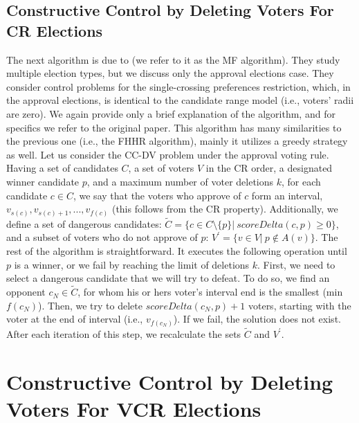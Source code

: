 \subsection{Constructive Control by Deleting Voters For CR Elections}\label{ch5:sec:1:cc-dv-cr}

The next algorithm is due to \cite{control-cr-how-hard-magiera-faliszewski} (we refer to it as the MF algorithm).
They study multiple election types, but we discuss only the approval elections case.
They consider control problems for the single-crossing preferences restriction,
which, in the approval elections, is identical to the candidate range model (i.e., voters' radii are zero).
We again provide only a brief explanation of the algorithm, and for specifics we refer to the original paper. 
This algorithm has many similarities to the previous one (i.e., the FHHR algorithm), mainly it utilizes a greedy strategy as well.
Let us consider the CC-DV problem under the approval voting rule.
Having a set of candidates $C$, a set of voters $V$ in the CR order,
a designated winner candidate $p$, and a maximum number of voter deletions $k$,
for each candidate $c \in C$, we say that the voters who approve of $c$ form an interval,
$v_{s(c)}, v_{s(c)+1}, ..., v_{f(c)}$ (this follows from the CR property).
Additionally, we define a set of dangerous candidates: $\widetilde{C} = \{c \in C \setminus \{p\} | \: scoreDelta(c,p) \geq 0\}$,
and a subset of voters who do not approve of $p$: $V^{\prime} = \{v \in V | \: p \notin A(v)\}$.
The rest of the algorithm is straightforward.
It executes the following operation until $p$ is a winner, or we fail by reaching the limit of deletions $k$.
First, we need to select a dangerous candidate that we will try to defeat.
To do so, we find an opponent $c_N \in \widetilde{C}$, for whom his or hers voter's interval end is the smallest (min $f(c_N)$).
Then, we try to delete $scoreDelta(c_N, p) + 1$ voters, starting with the voter at the end of interval (i.e., $v_{f(c_N)}$).
If we fail, the solution does not exist. After each iteration of this step, we recalculate the sets $\widetilde{C}$ and $V^{\prime}$.


\section{Constructive Control by Deleting Voters For VCR Elections}\label{ch5:sec2:vcr-control}

